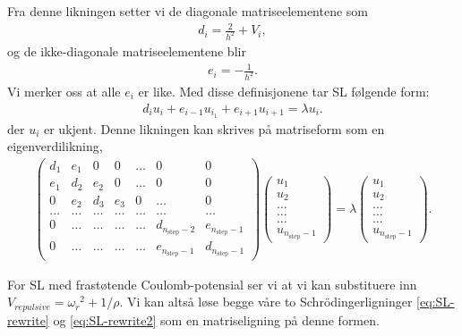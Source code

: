 \documentclass[11pt]{article}
\begin{document}
Fra denne likningen setter vi de diagonale matriseelementene som 
\begin{align*}
  d_i = \frac{ 2 }{ h^2 } + V_i,
\end{align*}
og de ikke-diagonale matriseelementene blir 
\begin{align*}
  e_i = -\frac{ 1 }{ h^2 }.
\end{align*}
Vi merker oss at alle $e_i$ er like. Med disse definisjonene tar SL
følgende form:
\begin{align*}
  d_iu_i + e_{i-1}u_{i_1} + e_{i+1}u_{i+1} = \lambda u_i.
\end{align*}
der $u_i$ er ukjent. Denne likningen kan skrives på matriseform som
en eigenverdilikning,
\begin{align}
  \left(\begin{array}{ccccccc}
      d_1 & e_1 & 0 & 0 & \dots & 0 & 0\\
      e_1& d_2 & e_2 & 0 & \dots & 0 & 0\\
      0  & e_2 & d_3 & e_3 & 0 & \dots & 0\\
      \dots & \dots & \dots & \dots & \dots & \dots & \dots\\
      0 & \dots & \dots & \dots & \dots & d_{n_\text{step}-2} & e_{n_\text{step}-1}\\
      0 & \dots & \dots & \dots & \dots & e_{n_\text{step}-1} & d_{n_\text{step}-1}
    \end{array}\right)
    \left(\begin{array}{c}
        u_1\\
        u_2\\
        \dots\\
        \dots\\
        \dots\\
        u_{n_\text{step}-1}
      \end{array}\right) = 
     \lambda 
    \left(\begin{array}{c}
        u_1\\
        u_2\\
        \dots\\
        \dots\\
        \dots\\
        u_{n_\text{step}-1}
      \end{array}\right)\label{eq:SL-matrix}.
\end{align}

For SL med frastøtende Coulomb-potensial ser vi at vi kan substituere
inn $V_{repulsive} = {\omega_r}^2 + 1/\rho$. 
Vi kan altså løse begge våre to Schr\"odingerligninger \eqref{eq:SL-rewrite} 
og \eqref{eq:SL-rewrite2} som en matriseligning på denne formen. 
\end{document}

